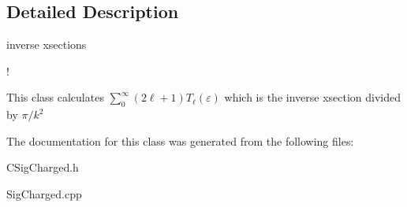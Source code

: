 \subsection{Detailed Description}
inverse xsections 

!

This class calculates $ \sum_{0}^{\infty} (2\ell+1) T_{\ell}(\varepsilon)$ which is the inverse xsection divided by $ \pi/k^2 $ 



The documentation for this class was generated from the following files:\begin{CompactItemize}
\item 
CSig\-Charged.h\item 
Sig\-Charged.cpp\end{CompactItemize}
